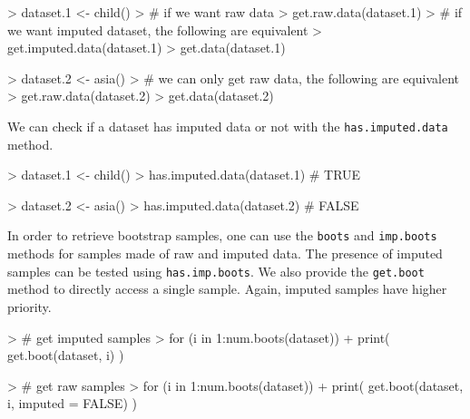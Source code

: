 \documentclass{article}
\newcommand{\Rmethod}[1]{{\texttt{#1}}}
\begin{document}
\begin{Schunk}
\begin{Sinput}
> dataset.1 <- child()
> # if we want raw data
> get.raw.data(dataset.1)
> # if we want imputed dataset, the following are equivalent
> get.imputed.data(dataset.1)
> get.data(dataset.1)
\end{Sinput}
\end{Schunk}

\begin{Schunk}
\begin{Sinput}
> dataset.2 <- asia()
> # we can only get raw data, the following are equivalent
> get.raw.data(dataset.2)
> get.data(dataset.2)
\end{Sinput}
\end{Schunk}

We can check if a dataset has imputed data or not with the \Rmethod{has.imputed.data} method.
\begin{Schunk}
\begin{Sinput}
> dataset.1 <- child()
> has.imputed.data(dataset.1) # TRUE
\end{Sinput}
\end{Schunk}

\begin{Schunk}
\begin{Sinput}
> dataset.2 <- asia()
> has.imputed.data(dataset.2) # FALSE
\end{Sinput}
\end{Schunk}

In order to retrieve bootstrap samples, one can use the \Rmethod{boots} and \Rmethod{imp.boots} methods for samples
made of raw and imputed data. The presence of imputed samples can be tested using \Rmethod{has.imp.boots}.
We also provide the \Rmethod{get.boot} method to directly access a single sample. Again, imputed samples have higher priority.
\begin{Schunk}
\begin{Sinput}
> # get imputed samples
> for (i in 1:num.boots(dataset))
+   print( get.boot(dataset, i) )
\end{Sinput}
\end{Schunk}

\begin{Schunk}
\begin{Sinput}
> # get raw samples
> for (i in 1:num.boots(dataset))
+   print( get.boot(dataset, i, imputed = FALSE) )
\end{Sinput}
\end{Schunk}
\end{document}
